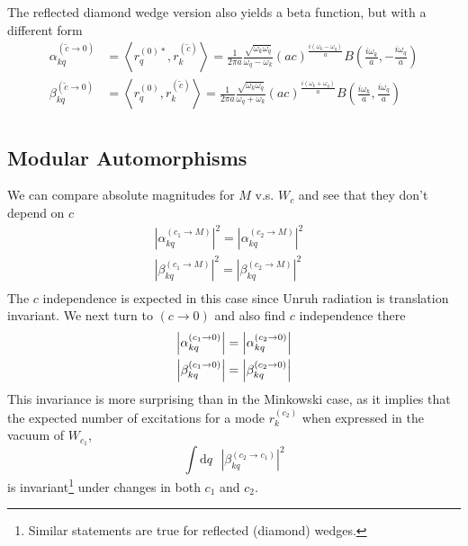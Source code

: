 \documentclass[12pt,a4paper]{article}
\newcommand{\dv}[1]{\mathrm{d} #1 \text{ }}
\begin{document}
The reflected diamond wedge version also yields a beta function, but with a different form
\begin{equation}
  \begin{aligned}
    \alpha^{(\widetilde{c} \rightarrow 0)}_{kq}     &= \left<r_q^{(0)*}, r_k^{(\widetilde{c})} \right> = \frac{1}{2 \pi a}\frac{\sqrt{\omega_k \omega_q}}{\omega_q - \omega_k} (ac)^{\frac{i(\omega_k - \omega_q)}{a}} B\left(\frac{i\omega_k}{a}, -\frac{i\omega_q}{a}\right) \\
    \beta^{(\widetilde{c} \rightarrow 0)}_{kq} &= \left<r_q^{(0)}, r_k^{(\widetilde{c})} \right> = \frac{1}{2 \pi a}\frac{\sqrt{\omega_k \omega_q}}{\omega_q + \omega_k} (ac)^{\frac{i(\omega_k + \omega_q)}{a}} B\left(\frac{i\omega_k}{a}, \frac{i\omega_q}{a}\right) \\
  \end{aligned}
  \label{bogoTC0}
\end{equation}

\subsection{Modular Automorphisms}

We can compare absolute magnitudes for $M$ v.s. $W_c$ and see that they don't depend on $c$
\begin{equation}
  \begin{array}{cc}
    \left|\alpha_{kq}^{(c_1 \rightarrow M)}\right|^2 = \left|\alpha_{kq}^{(c_2 \rightarrow M)}\right|^2 & \\
    \left|\beta_{kq}^{(c_1 \rightarrow M)}\right|^2 = \left|\beta_{kq}^{(c_2 \rightarrow M)}\right|^2 & \\
 \end{array}
\end{equation}
The $c$ independence is expected in this case since Unruh radiation is translation invariant. We next turn to $(c \rightarrow 0)$ and also find $c$ independence there 
\begin{equation}
  \begin{array}{c}
    \left|\alpha_{kq}^{(c_1 \rightarrow 0)}\right| = \left|\alpha_{kq}^{(c_2 \rightarrow 0)}\right| \vspace{4pt} \\
    \left|\beta_{kq}^{(c_1 \rightarrow 0)}\right| = \left|\beta_{kq}^{(c_2 \rightarrow 0)}\right| \\
  \end{array}
\end{equation}
This invariance is more surprising than in the Minkowski case, as it implies that the expected number of excitations for a mode $r_k^{(c_2)}$ when expressed in the vacuum of $W_{c_1}$,
\begin{equation}
  \int \dv{q} |\beta^{(c_2 \rightarrow c_1)}_{kq}|^2
\end{equation}
is invariant\footnote{Similar statements are true for reflected (diamond) wedges.} under changes in both $c_1$ and $c_2$.
\end{document}
